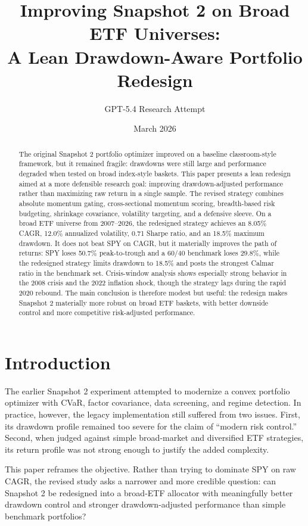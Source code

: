 \documentclass[11pt]{article}
\title{Improving Snapshot 2 on Broad ETF Universes:\\A Lean Drawdown-Aware Portfolio Redesign}
\author{GPT-5.4 Research Attempt}
\date{March 2026}
\begin{document}
\maketitle

\begin{abstract}
The original Snapshot 2 portfolio optimizer improved on a baseline classroom-style framework, but it remained fragile: drawdowns were still large and performance degraded when tested on broad index-style baskets. This paper presents a lean redesign aimed at a more defensible research goal: improving drawdown-adjusted performance rather than maximizing raw return in a single sample. The revised strategy combines absolute momentum gating, cross-sectional momentum scoring, breadth-based risk budgeting, shrinkage covariance, volatility targeting, and a defensive sleeve. On a broad ETF universe from 2007--2026, the redesigned strategy achieves an 8.05\% CAGR, 12.0\% annualized volatility, 0.71 Sharpe ratio, and an 18.5\% maximum drawdown. It does not beat SPY on CAGR, but it materially improves the path of returns: SPY loses 50.7\% peak-to-trough and a 60/40 benchmark loses 29.8\%, while the redesigned strategy limits drawdown to 18.5\% and posts the strongest Calmar ratio in the benchmark set. Crisis-window analysis shows especially strong behavior in the 2008 crisis and the 2022 inflation shock, though the strategy lags during the rapid 2020 rebound. The main conclusion is therefore modest but useful: the redesign makes Snapshot 2 materially more robust on broad ETF baskets, with better downside control and more competitive risk-adjusted performance.
\end{abstract}

\section{Introduction}

The earlier Snapshot 2 experiment attempted to modernize a convex portfolio optimizer with CVaR, factor covariance, data screening, and regime detection. In practice, however, the legacy implementation still suffered from two issues. First, its drawdown profile remained too severe for the claim of ``modern risk control.'' Second, when judged against simple broad-market and diversified ETF strategies, its return profile was not strong enough to justify the added complexity.

This paper reframes the objective. Rather than trying to dominate SPY on raw CAGR, the revised study asks a narrower and more credible question: can Snapshot 2 be redesigned into a broad-ETF allocator with meaningfully better drawdown control and stronger drawdown-adjusted performance than simple benchmark portfolios?
\end{document}

